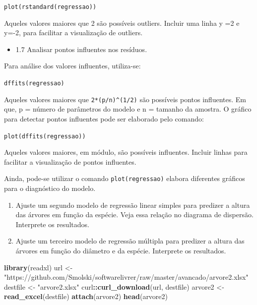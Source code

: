 \documentclass[12pt,brazil,]{book}
\newenvironment{Shaded}{\begin{snugshade}}{\end{snugshade}}
\newcommand{\KeywordTok}[1]{\textcolor[rgb]{0.13,0.29,0.53}{\textbf{#1}}}
\newcommand{\NormalTok}[1]{#1}
\newcommand{\OperatorTok}[1]{\textcolor[rgb]{0.81,0.36,0.00}{\textbf{#1}}}
\newcommand{\StringTok}[1]{\textcolor[rgb]{0.31,0.60,0.02}{#1}}
\providecommand{\tightlist}{%
  \setlength{\itemsep}{0pt}\setlength{\parskip}{0pt}}
\begin{document}
\texttt{plot(rstandard(regressao))}

Aqueles valores maiores que \textbar{}2\textbar{} são possíveis
outliers. Incluir uma linha y =2 e y=-2, para facilitar a visualização
de outliers.

\begin{itemize}
\tightlist
\item
  1.7 Analisar pontos influentes nos resíduos.
\end{itemize}

Para análise dos valores influentes, utiliza-se:

\texttt{dffits(regressao)}

Aqueles valores maiores que \texttt{2*(p/n)\^{}(1/2)} são possíveis
pontos influentes. Em que, p = número de parâmetros do modelo e n =
tamanho da amostra. O gráfico para detectar pontos influentes pode ser
elaborado pelo comando:

\texttt{plot(dffits(regressao))}

Aqueles valores maiores, em módulo, são possíveis influentes. Incluir
linhas para facilitar a visualização de pontos influentes.

Ainda, pode-se utilizar o comando \texttt{plot(regressao)} elabora
diferentes gráficos para o diagnóstico do modelo.

\begin{enumerate}
\def\labelenumi{\arabic{enumi})}
\setcounter{enumi}{1}
\item
  Ajuste um segundo modelo de regressão linear simples para predizer a
  altura das árvores em função da espécie. Veja essa relação no diagrama
  de dispersão. Interprete os resultados.
\item
  Ajuste um terceiro modelo de regressão múltipla para predizer a altura
  das árvores em função do diâmetro e da espécie. Interprete os
  resultados.
\end{enumerate}

\begin{Shaded}
\begin{Highlighting}[]
\KeywordTok{library}\NormalTok{(readxl)}
\NormalTok{url <-}\StringTok{ "https://github.com/Smolski/softwarelivrer/raw/master/avancado/arvore2.xlsx"}
\NormalTok{destfile <-}\StringTok{ "arvore2.xlsx"}
\NormalTok{curl}\OperatorTok{::}\KeywordTok{curl_download}\NormalTok{(url, destfile)}
\NormalTok{arvore2 <-}\StringTok{ }\KeywordTok{read_excel}\NormalTok{(destfile)}
\KeywordTok{attach}\NormalTok{(arvore2)}
\KeywordTok{head}\NormalTok{(arvore2)}
\end{Highlighting}
\end{Shaded}
\end{document}
